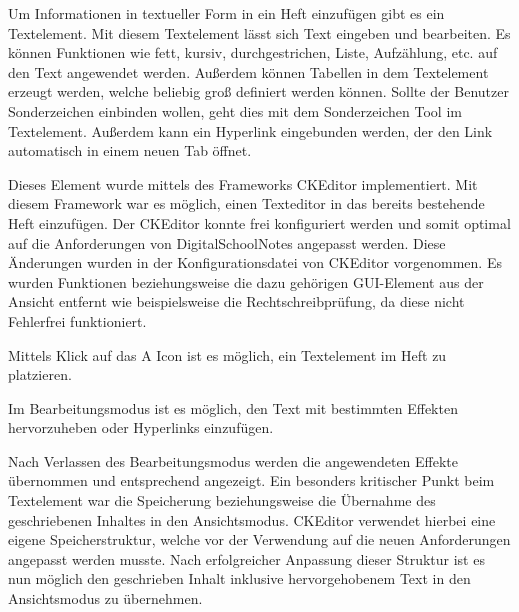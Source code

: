 Um Informationen in textueller Form in ein Heft einzufügen gibt es ein Textelement. Mit diesem Textelement lässt sich Text eingeben und bearbeiten. Es können Funktionen wie fett, kursiv, durchgestrichen, Liste, Aufzählung, etc. auf den Text angewendet werden. Außerdem können Tabellen in dem Textelement erzeugt werden, welche beliebig groß definiert werden können. Sollte der Benutzer Sonderzeichen einbinden wollen, geht dies mit dem Sonderzeichen Tool im Textelement. Außerdem kann ein Hyperlink eingebunden werden, der den Link automatisch in einem neuen Tab öffnet.

Dieses Element wurde mittels des Frameworks CKEditor implementiert. Mit diesem Framework war es möglich, einen Texteditor in das bereits bestehende Heft einzufügen. Der CKEditor konnte frei konfiguriert werden und somit optimal auf die Anforderungen von DigitalSchoolNotes angepasst werden. Diese Änderungen wurden in der Konfigurationsdatei von CKEditor vorgenommen. Es wurden Funktionen beziehungsweise die dazu gehörigen GUI-Element aus der Ansicht entfernt wie beispielsweise die Rechtschreibprüfung, da diese nicht Fehlerfrei funktioniert.\cite{CKEDITOR}

Mittels Klick auf das A Icon ist es möglich, ein Textelement im Heft zu platzieren.

Im Bearbeitungsmodus ist es möglich, den Text mit bestimmten Effekten hervorzuheben oder Hyperlinks einzufügen.

Nach Verlassen des Bearbeitungsmodus werden die angewendeten Effekte übernommen und entsprechend angezeigt.
Ein besonders kritischer Punkt beim Textelement war die Speicherung beziehungsweise die Übernahme des geschriebenen Inhaltes in den Ansichtsmodus. CKEditor verwendet hierbei eine eigene Speicherstruktur, welche vor der Verwendung auf die neuen Anforderungen angepasst werden musste. Nach erfolgreicher Anpassung dieser Struktur ist es nun möglich den geschrieben Inhalt inklusive hervorgehobenem Text in den Ansichtsmodus zu übernehmen.

